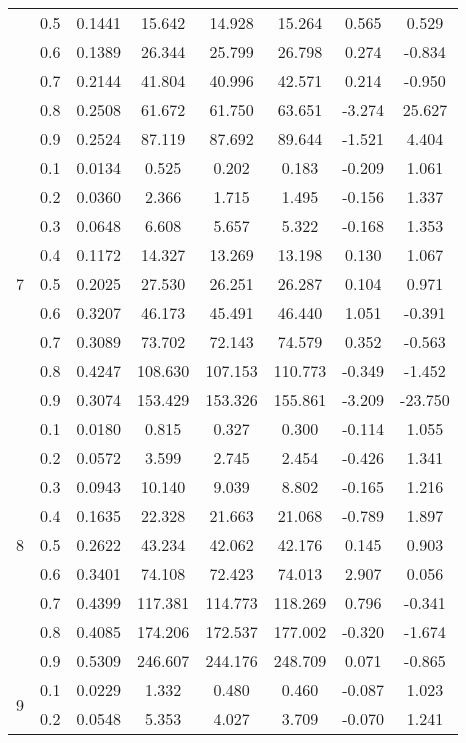 \documentclass[11pt,a4paper]{report}
\begin{document}
\begin{longtable}{ | c | c || c | c | c | c | c | c | }
 & 0.5 & 0.1441 & 15.642 & 14.928 & 15.264 & 0.565 & 0.529 \\
 & 0.6 & 0.1389 & 26.344 & 25.799 & 26.798 & 0.274 & -0.834 \\
 & 0.7 & 0.2144 & 41.804 & 40.996 & 42.571 & 0.214 & -0.950 \\
 & 0.8 & 0.2508 & 61.672 & 61.750 & 63.651 & -3.274 & 25.627 \\
 & 0.9 & 0.2524 & 87.119 & 87.692 & 89.644 & -1.521 & 4.404 \\
 \hline
\multirow{9}{*}{7} & 0.1 & 0.0134 & 0.525 & 0.202 & 0.183 & -0.209 & 1.061 \\
 & 0.2 & 0.0360 & 2.366 & 1.715 & 1.495 & -0.156 & 1.337 \\
 & 0.3 & 0.0648 & 6.608 & 5.657 & 5.322 & -0.168 & 1.353 \\
 & 0.4 & 0.1172 & 14.327 & 13.269 & 13.198 & 0.130 & 1.067 \\
 & 0.5 & 0.2025 & 27.530 & 26.251 & 26.287 & 0.104 & 0.971 \\
 & 0.6 & 0.3207 & 46.173 & 45.491 & 46.440 & 1.051 & -0.391 \\
 & 0.7 & 0.3089 & 73.702 & 72.143 & 74.579 & 0.352 & -0.563 \\
 & 0.8 & 0.4247 & 108.630 & 107.153 & 110.773 & -0.349 & -1.452 \\
 & 0.9 & 0.3074 & 153.429 & 153.326 & 155.861 & -3.209 & -23.750 \\
 \hline
\multirow{9}{*}{8} & 0.1 & 0.0180 & 0.815 & 0.327 & 0.300 & -0.114 & 1.055 \\
 & 0.2 & 0.0572 & 3.599 & 2.745 & 2.454 & -0.426 & 1.341 \\
 & 0.3 & 0.0943 & 10.140 & 9.039 & 8.802 & -0.165 & 1.216 \\
 & 0.4 & 0.1635 & 22.328 & 21.663 & 21.068 & -0.789 & 1.897 \\
 & 0.5 & 0.2622 & 43.234 & 42.062 & 42.176 & 0.145 & 0.903 \\
 & 0.6 & 0.3401 & 74.108 & 72.423 & 74.013 & 2.907 & 0.056 \\
 & 0.7 & 0.4399 & 117.381 & 114.773 & 118.269 & 0.796 & -0.341 \\
 & 0.8 & 0.4085 & 174.206 & 172.537 & 177.002 & -0.320 & -1.674 \\
 & 0.9 & 0.5309 & 246.607 & 244.176 & 248.709 & 0.071 & -0.865 \\
 \hline
\multirow{9}{*}{9} & 0.1 & 0.0229 & 1.332 & 0.480 & 0.460 & -0.087 & 1.023 \\
 & 0.2 & 0.0548 & 5.353 & 4.027 & 3.709 & -0.070 & 1.241 \\

\end{longtable}
\end{document}
